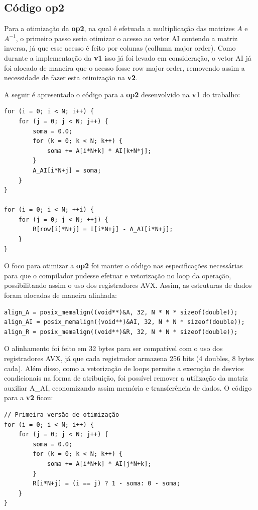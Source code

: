 \documentclass[12pt]{article}
\begin{document}
\subsection{Código op2}

Para a otimização da \textbf{op2}, na qual é efetuada a multiplicação das matrizes $A$ e ${A}^{-1}$, o primeiro passo seria otimizar o acesso ao vetor AI contendo a matriz inversa, já que esse acesso é feito por colunas (collumn major order). Como durante a implementação da \textbf{v1} isso já foi levado em consideração, o vetor AI já foi alocado de maneira que o acesso fosse row major order, removendo assim a necessidade de fazer esta otimização na \textbf{v2}.

A seguir é apresentado o código para a \textbf{op2} desenvolvido na \textbf{v1} do trabalho:
\begin{lstlisting}
for (i = 0; i < N; i++) {
	for (j = 0; j < N; j++) {
		soma = 0.0;
		for (k = 0; k < N; k++) {
			soma += A[i*N+k] * AI[k+N*j];
		}
		A_AI[i*N+j] = soma;
	}
}

for (i = 0; i < N; ++i) {
	for (j = 0; j < N; ++j) {
        R[row[i]*N+j] = I[i*N+j] - A_AI[i*N+j];
	}
}
\end{lstlisting}


O foco para otimizar a \textbf{op2} foi manter o código nas especificações necessárias para que o compilador pudesse efetuar e vetorização no loop da operação, possibilitando assim o uso dos registradores AVX. Assim, as estruturas de dados foram alocadas de maneira alinhada:

\begin{lstlisting}
align_A = posix_memalign((void**)&A, 32, N * N * sizeof(double));
align_AI = posix_memalign((void**)&AI, 32, N * N * sizeof(double));
align_R = posix_memalign((void**)&R, 32, N * N * sizeof(double));
\end{lstlisting}

O alinhamento foi feito em 32 bytes para ser compatível com o uso dos registradores AVX, já que cada registrador armazena 256 bits (4 doubles, 8 bytes cada). Além disso, como a vetorização de loops permite a execução de desvios condicionais na forma de atribuição, foi possível remover a utilização da matriz auxiliar A\_AI, economizando assim memória e transferência de dados. O código para a \textbf{v2} ficou:

\begin{lstlisting}
// Primeira versão de otimização
for (i = 0; i < N; i++) {
	for (j = 0; j < N; j++) {
		soma = 0.0;
		for (k = 0; k < N; k++) {
			soma += A[i*N+k] * AI[j*N+k];
		}
		R[i*N+j] = (i == j) ? 1 - soma: 0 - soma;
	}
}
\end{lstlisting}
\end{document}

